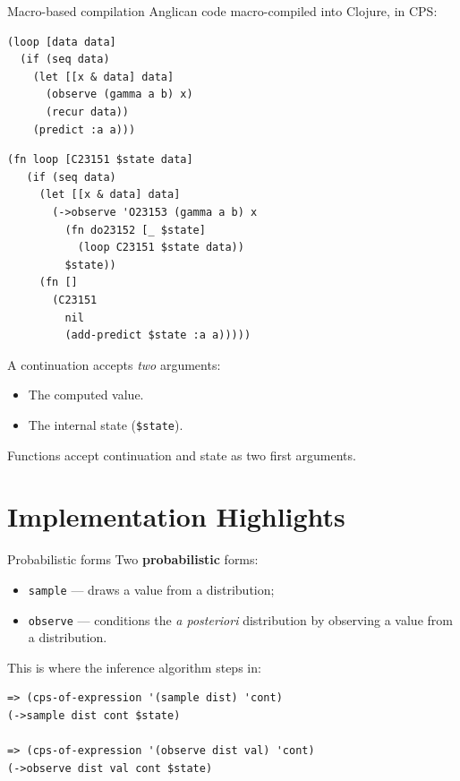 \documentclass{beamer}
\begin{document}
\begin{frame}[fragile]{Macro-based compilation}
    Anglican code macro-compiled into Clojure, in CPS:
    \begin{minipage}{0.48\textwidth}
\begin{verbatim}
(loop [data data]
  (if (seq data)
    (let [[x & data] data]
      (observe (gamma a b) x)
      (recur data))
    (predict :a a)))
\end{verbatim}
    \end{minipage}
    \begin{minipage}{0.44\textwidth}
    \vspace{2em}
\begin{verbatim}
(fn loop [C23151 $state data]
   (if (seq data)
     (let [[x & data] data]
       (->observe 'O23153 (gamma a b) x
         (fn do23152 [_ $state]
           (loop C23151 $state data))
         $state))
     (fn []
       (C23151
         nil
         (add-predict $state :a a)))))
\end{verbatim}
    \end{minipage}
	\bigskip

	A continuation accepts \textit{two} arguments:
	\begin{itemize}
		\item The computed value.
		\item The internal state (\texttt{\$state}).
	\end{itemize}
	Functions accept continuation and state as two first arguments.
\end{frame}

\section{Implementation Highlights}

\begin{frame}[fragile]{Probabilistic forms}
    Two \textbf{probabilistic} forms:
    \begin{itemize}
        \item \texttt{sample} --- draws a value from a
            distribution;
        \item \texttt{observe} --- conditions the \textit{a
            posteriori} distribution by observing a value from a
            distribution.
    \end{itemize}
    \bigskip
    This is where the inference algorithm steps in:
\begin{verbatim}
=> (cps-of-expression '(sample dist) 'cont)
(->sample dist cont $state)

=> (cps-of-expression '(observe dist val) 'cont)
(->observe dist val cont $state)
\end{verbatim}
\end{frame}
\end{document}
